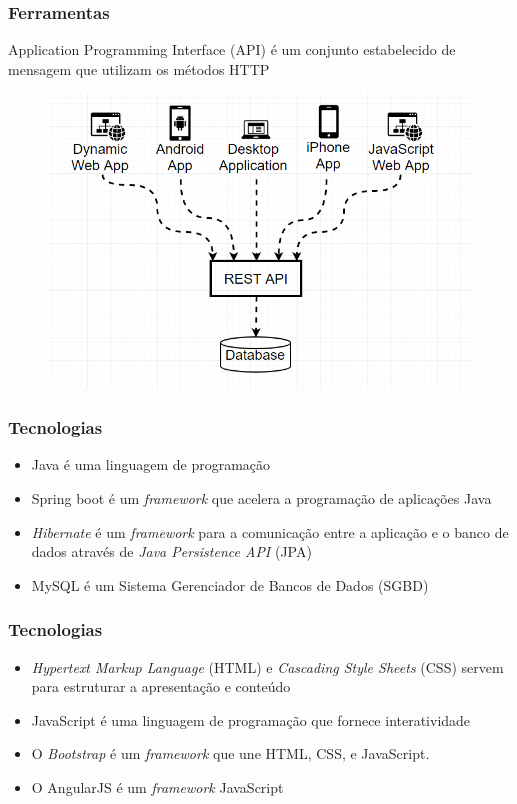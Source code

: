 \documentclass{beamer}
\begin{document}
	\begin{frame}\frametitle{Ferramentas}
		Application Programming Interface (API) é um conjunto estabelecido de mensagem que utilizam os métodos HTTP
			\begin{figure}[ht]
				\centering
				\includegraphics[scale=0.375]{img/rest_api.png}
			\end{figure}
	\end{frame}

	\begin{frame}\frametitle{Tecnologias}
		\begin{itemize}
			\item Java é uma linguagem de programação
			\item Spring boot é um \textit{framework} que acelera a programação de aplicações Java
			\item \textit{Hibernate} é um \textit{framework} para a comunicação entre a aplicação e o banco de dados através de \textit{Java Persistence API} (JPA)
			\item MySQL é um Sistema Gerenciador de Bancos de Dados (SGBD)
		\end{itemize}
	\end{frame}

	\begin{frame}\frametitle{Tecnologias}
		\begin{itemize}
			\item \textit{Hypertext Markup Language} (HTML) e \textit{Cascading Style Sheets} (CSS) servem para estruturar a apresentação e conteúdo

			\item JavaScript é uma linguagem de programação que fornece interatividade
			\item O \textit{Bootstrap} é um \textit{framework} que une HTML, CSS, e JavaScript.
			\item O AngularJS é um \textit{framework} JavaScript 
		\end{itemize}
	\end{frame}
\end{document}
